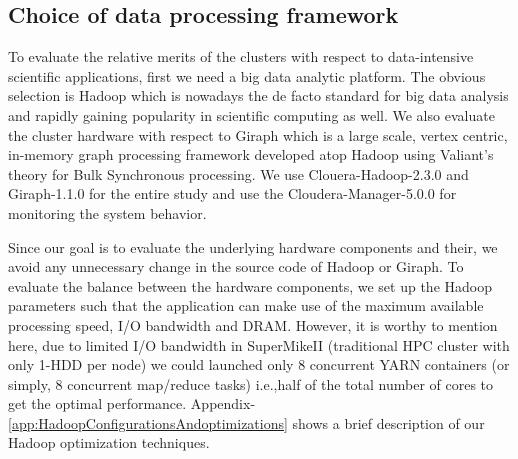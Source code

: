 \documentclass[journal]{IEEEtran}
\begin{document}
\subsection{Choice of data processing framework}
To evaluate the relative merits of the clusters with respect to data-intensive scientific applications, first we need a big data analytic platform. The obvious selection is Hadoop which is nowadays the de facto standard for big data analysis and rapidly gaining popularity in scientific computing as well. We also evaluate the cluster hardware with respect to Giraph which is a large scale, vertex centric, in-memory graph processing framework developed atop Hadoop using Valiant's theory for Bulk Synchronous processing. We use Clouera-Hadoop-2.3.0 and Giraph-1.1.0 for the entire study and use the Cloudera-Manager-5.0.0 for monitoring the system behavior. 

Since our goal is to evaluate the underlying hardware components and their, we avoid any unnecessary change in the source code of Hadoop or Giraph. To evaluate the balance between the hardware components, we set up the Hadoop parameters such that the application can make use of the maximum available processing speed, I/O bandwidth and DRAM. However, it is worthy to mention here, due to limited I/O bandwidth in SuperMikeII (traditional HPC cluster with only 1-HDD per node) we could launched only 8 concurrent YARN containers (or simply, 8 concurrent map/reduce tasks) i.e.,half of the total number of cores to get the optimal performance. Appendix-\ref{app:HadoopConfigurationsAndoptimizations} shows a brief description of our Hadoop optimization techniques.
\end{document}
